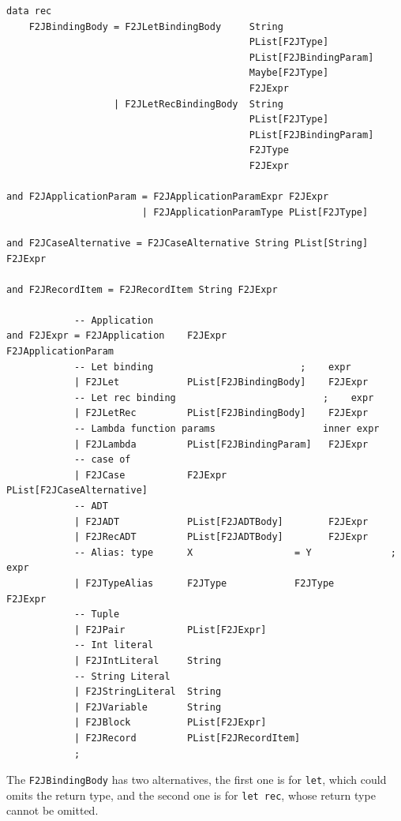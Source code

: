 \begin{lstlisting}[xleftmargin=0pt]
data rec
    F2JBindingBody = F2JLetBindingBody     String
                                           PList[F2JType]
                                           PList[F2JBindingParam]
                                           Maybe[F2JType]
                                           F2JExpr
                   | F2JLetRecBindingBody  String
                                           PList[F2JType]
                                           PList[F2JBindingParam]
                                           F2JType
                                           F2JExpr

and F2JApplicationParam = F2JApplicationParamExpr F2JExpr
                        | F2JApplicationParamType PList[F2JType]

and F2JCaseAlternative = F2JCaseAlternative String PList[String] F2JExpr

and F2JRecordItem = F2JRecordItem String F2JExpr

            -- Application
and F2JExpr = F2JApplication    F2JExpr                  F2JApplicationParam
            -- Let binding                          ;    expr
            | F2JLet            PList[F2JBindingBody]    F2JExpr
            -- Let rec binding                          ;    expr
            | F2JLetRec         PList[F2JBindingBody]    F2JExpr
            -- Lambda function params                   inner expr
            | F2JLambda         PList[F2JBindingParam]   F2JExpr
            -- case of
            | F2JCase           F2JExpr            PList[F2JCaseAlternative]
            -- ADT
            | F2JADT            PList[F2JADTBody]        F2JExpr
            | F2JRecADT         PList[F2JADTBody]        F2JExpr
            -- Alias: type      X                  = Y              ; expr
            | F2JTypeAlias      F2JType            F2JType          F2JExpr
            -- Tuple
            | F2JPair           PList[F2JExpr]
            -- Int literal
            | F2JIntLiteral     String
            -- String Literal
            | F2JStringLiteral  String
            | F2JVariable       String
            | F2JBlock          PList[F2JExpr]
            | F2JRecord         PList[F2JRecordItem]
            ;
\end{lstlisting}

The \texttt{F2JBindingBody} has two alternatives, the first one is for \texttt{let}, which could omits the return type, and the second one is for \texttt{let rec}, whose return type cannot be omitted.

